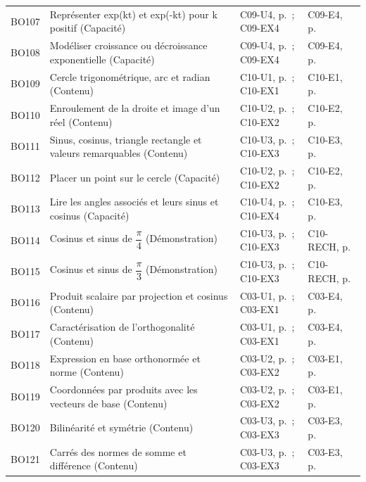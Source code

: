 \begin{longtable}{p{.1\linewidth}p{.43\linewidth}p{.19\linewidth}p{.16\linewidth}}
BO107 & Représenter exp(kt) et exp(-kt) pour k positif (Capacité) & C09-U4, p.\,\pageref{C09-U4} ; C09-EX4 & C09-E4, p.\,\pageref{C09-E4} \\
BO108 & Modéliser croissance ou décroissance exponentielle (Capacité) & C09-U4, p.\,\pageref{C09-U4} ; C09-EX4 & C09-E4, p.\,\pageref{C09-E4} \\
BO109 & Cercle trigonométrique, arc et radian (Contenu) & C10-U1, p.\,\pageref{C10-U1} ; C10-EX1 & C10-E1, p.\,\pageref{C10-E1} \\
BO110 & Enroulement de la droite et image d’un réel (Contenu) & C10-U2, p.\,\pageref{C10-U2} ; C10-EX2 & C10-E2, p.\,\pageref{C10-E2} \\
BO111 & Sinus, cosinus, triangle rectangle et valeurs remarquables (Contenu) & C10-U3, p.\,\pageref{C10-U3} ; C10-EX3 & C10-E3, p.\,\pageref{C10-E3} \\
BO112 & Placer un point sur le cercle (Capacité) & C10-U2, p.\,\pageref{C10-U2} ; C10-EX2 & C10-E2, p.\,\pageref{C10-E2} \\
BO113 & Lire les angles associés et leurs sinus et cosinus (Capacité) & C10-U4, p.\,\pageref{C10-U4} ; C10-EX4 & C10-E3, p.\,\pageref{C10-E3} \\
BO114 & Cosinus et sinus de $\dfrac{\pi}{4}$ (Démonstration) & C10-U3, p.\,\pageref{C10-U3} ; C10-EX3 & C10-RECH, p.\,\pageref{C10-RECH} \\
BO115 & Cosinus et sinus de $\dfrac{\pi}{3}$ (Démonstration) & C10-U3, p.\,\pageref{C10-U3} ; C10-EX3 & C10-RECH, p.\,\pageref{C10-RECH} \\
BO116 & Produit scalaire par projection et cosinus (Contenu) & C03-U1, p.\,\pageref{C03-U1} ; C03-EX1 & C03-E4, p.\,\pageref{C03-E4} \\
BO117 & Caractérisation de l’orthogonalité (Contenu) & C03-U1, p.\,\pageref{C03-U1} ; C03-EX1 & C03-E4, p.\,\pageref{C03-E4} \\
BO118 & Expression en base orthonormée et norme (Contenu) & C03-U2, p.\,\pageref{C03-U2} ; C03-EX2 & C03-E1, p.\,\pageref{C03-E1} \\
BO119 & Coordonnées par produits avec les vecteurs de base (Contenu) & C03-U2, p.\,\pageref{C03-U2} ; C03-EX2 & C03-E1, p.\,\pageref{C03-E1} \\
BO120 & Bilinéarité et symétrie (Contenu) & C03-U3, p.\,\pageref{C03-U3} ; C03-EX3 & C03-E3, p.\,\pageref{C03-E3} \\
BO121 & Carrés des normes de somme et différence (Contenu) & C03-U3, p.\,\pageref{C03-U3} ; C03-EX3 & C03-E3, p.\,\pageref{C03-E3} \\

\end{longtable}
